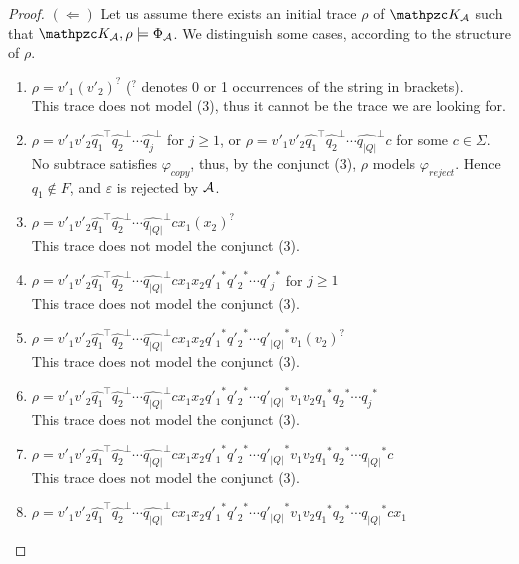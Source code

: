 \begin{proof}
$(\Leftarrow)$ Let us assume there exists an initial trace $\rho$ of $\Ku_\Au$ such that $\Ku_\Au,\rho\models \Phi_\Au$. We distinguish some cases, according to the structure of $\rho$.
\begin{enumerate}
    \item $\rho=v'_1(v'_2)^?$ ($^?$ denotes 0 or 1 occurrences of the string in brackets).\\ 
    This trace does not model (3), thus it cannot be the trace we are looking for.
    \item $\rho\!=\!v'_1v'_2\widehat{q_1}^\top\widehat{q_2}^\bot \cdots \widehat{q_j}^\bot$ for $j\geq 1$, or $\rho\!=\!v'_1v'_2\widehat{q_1}^\top\widehat{q_2}^\bot \cdots \widehat{q_{|Q|}}^\bot c$ for some $c\!\in\!\Sigma$.\\
    No subtrace satisfies $\varphi_{copy}$, thus, by the conjunct (3), $\rho$ models $\varphi_{reject}$. Hence $q_1\notin F$, and $\varepsilon$ is rejected by $\mathcal{A}$.
    \item $\rho=v'_1v'_2\widehat{q_1}^\top\widehat{q_2}^\bot \cdots \widehat{q_{|Q|}}^\bot c x_1(x_2)^?$\\
    This trace does not model the conjunct (3).
    \item $\rho=v'_1v'_2\widehat{q_1}^\top\widehat{q_2}^\bot \cdots \widehat{q_{|Q|}}^\bot c x_1x_2{q'_1}^*{q'_2}^*\cdots {q'_j}^*$  for $j\geq 1$\\
    This trace does not model the conjunct (3).
    \item $\rho=v'_1v'_2\widehat{q_1}^\top\widehat{q_2}^\bot \cdots \widehat{q_{|Q|}}^\bot c x_1x_2{q'_1}^*{q'_2}^*\cdots {q'_{|Q|}}^*v_1(v_2)^?$\\
    This trace does not model the conjunct (3).
    \item $\rho=v'_1v'_2\widehat{q_1}^\top\widehat{q_2}^\bot \cdots \widehat{q_{|Q|}}^\bot c x_1x_2{q'_1}^*{q'_2}^*\cdots {q'_{|Q|}}^*v_1v_2{q_1}^*{q_2}^*\cdots {q_j}^*$\\
    This trace does not model the conjunct (3).
    \item $\rho=v'_1v'_2\widehat{q_1}^\top\widehat{q_2}^\bot \cdots \widehat{q_{|Q|}}^\bot c x_1x_2{q'_1}^*{q'_2}^*\cdots {q'_{|Q|}}^*v_1v_2{q_1}^*{q_2}^*\cdots {q_{|Q|}}^*c$\\
    This trace does not model the conjunct (3).
    \item $\rho=v'_1v'_2\widehat{q_1}^\top\widehat{q_2}^\bot \cdots \widehat{q_{|Q|}}^\bot c x_1x_2{q'_1}^*{q'_2}^*\cdots {q'_{|Q|}}^*v_1v_2{q_1}^*{q_2}^*\cdots {q_{|Q|}}^*cx_1$\\

\end{enumerate}
\end{proof}
